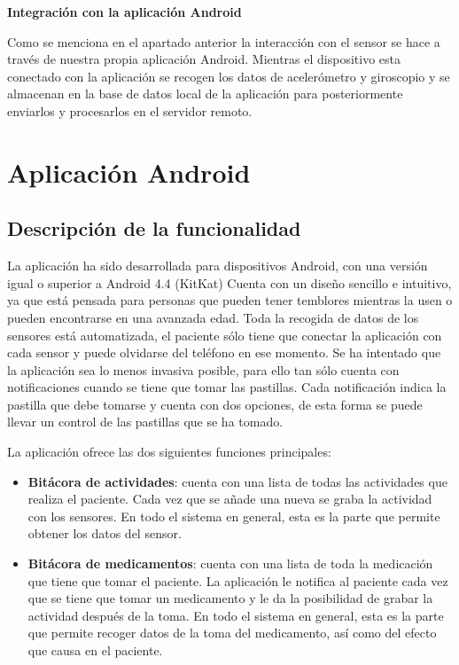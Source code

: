 \documentclass[11pt,spanish]{article}
\begin{document}
{\bf Integración con la aplicación Android}
\newline

Como se menciona en el apartado anterior la interacción con el sensor se hace a través de nuestra propia aplicación Android. Mientras el dispositivo esta conectado con la aplicación se recogen los datos de acelerómetro y giroscopio y se almacenan en la base de datos local de la aplicación para posteriormente enviarlos y procesarlos en el servidor remoto.


\section{Aplicación Android}
\subsection{Descripción de la funcionalidad}
La aplicación ha sido desarrollada para dispositivos Android, con una versión igual o superior a Android 4.4 (KitKat) Cuenta con un diseño sencillo e intuitivo, ya que está pensada para personas que pueden tener temblores mientras la usen o pueden encontrarse en una avanzada edad. Toda la recogida de datos de los sensores está automatizada, el paciente sólo tiene que conectar la aplicación con cada sensor y puede olvidarse del teléfono en ese momento. Se ha intentado que la aplicación sea lo menos invasiva posible, para ello tan sólo cuenta con notificaciones cuando se tiene que tomar las pastillas. Cada notificación indica la pastilla que debe tomarse y cuenta con dos opciones, de esta forma se puede llevar un control de las pastillas que se ha tomado.
\newline

La aplicación ofrece las dos siguientes funciones principales:

\begin{itemize}
	\item {\bf Bitácora de actividades}: cuenta con una lista de todas las actividades que realiza el paciente. Cada vez que se añade una nueva se graba la actividad con los sensores. En todo el sistema en general, esta es la parte que permite obtener los datos del sensor.
    \item {\bf Bitácora de medicamentos}: cuenta con una lista de toda la medicación que tiene que tomar el paciente. La aplicación le notifica al paciente cada vez que se tiene que tomar un medicamento y le da la posibilidad de grabar la actividad después de la toma. En todo el sistema en general, esta es la parte que permite recoger datos de la toma del medicamento, así como del efecto que causa en el paciente.
\end{itemize}
\end{document}
